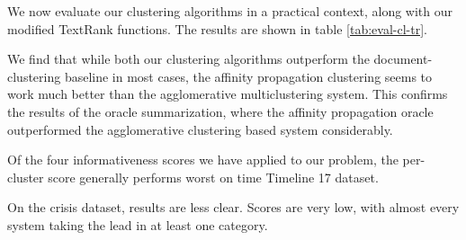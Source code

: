 \documentclass[a4paper,BCOR=10mm]{report}
\numberwithin{lemma}{chapter}
\numberwithin{definition}{chapter}
\begin{document}
%
%



We now evaluate our clustering algorithms in a practical context, along with our modified TextRank functions.
The results are shown in table \ref{tab:eval-cl-tr}.

We find that while both our clustering algorithms outperform the document-clustering baseline in most cases, the affinity propagation clustering seems to work much better than the agglomerative multiclustering system. This confirms the results of the oracle summarization, where the affinity propagation oracle outperformed the agglomerative clustering based system considerably.

Of the four informativeness scores we have applied to our problem, the per-cluster score generally performs worst on time Timeline 17 dataset.

On the crisis dataset, results are less clear.
Scores are very low, with almost every system taking the lead in at least one category.
\end{document}
